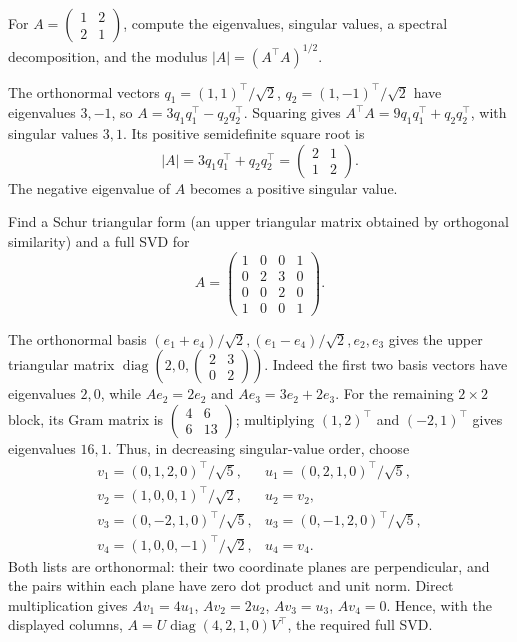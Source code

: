 \begin{problem}\label{ex:10:spectral-versus-singular}
For \(A=\begin{pmatrix}1&2\\2&1\end{pmatrix}\), compute the eigenvalues,
singular values, a spectral decomposition, and the modulus
\(|A|=(A^\top A)^{1/2}\).
\end{problem}
\begin{solution}
The orthonormal vectors \(q_1=(1,1)^\top/\sqrt2\),
\(q_2=(1,-1)^\top/\sqrt2\) have eigenvalues \(3,-1\), so
\(A=3q_1q_1^\top-q_2q_2^\top\).
Squaring gives \(A^\top A=9q_1q_1^\top+q_2q_2^\top\), with singular
values \(3,1\). Its positive semidefinite square root is
\[
|A|=3q_1q_1^\top+q_2q_2^\top=\begin{pmatrix}2&1\\1&2\end{pmatrix}.
\]
The negative eigenvalue of \(A\) becomes a positive singular value.
\end{solution}

\begin{problem}\label{ex:10:full-svd-construction}
Find a Schur triangular form (an upper triangular matrix obtained by
orthogonal similarity) and a full SVD for
\[
A=\begin{pmatrix}1&0&0&1\\0&2&3&0\\0&0&2&0\\1&0&0&1\end{pmatrix}.
\]
\end{problem}
\begin{solution}
The orthonormal basis \((e_1+e_4)/\sqrt2,(e_1-e_4)/\sqrt2,e_2,e_3\)
gives the upper triangular matrix
\(\operatorname{diag}\left(2,0,\begin{pmatrix}2&3\\0&2\end{pmatrix}\right)\).
Indeed the first two basis vectors have eigenvalues \(2,0\), while
\(Ae_2=2e_2\) and \(Ae_3=3e_2+2e_3\).
For the remaining \(2\times2\) block, its Gram matrix is
\(\begin{pmatrix}4&6\\6&13\end{pmatrix}\); multiplying \((1,2)^\top\)
and \((-2,1)^\top\) gives eigenvalues \(16,1\).
Thus, in decreasing singular-value order, choose
\[
\begin{array}{ll}
v_1=(0,1,2,0)^\top/\sqrt5,&u_1=(0,2,1,0)^\top/\sqrt5,\\
v_2=(1,0,0,1)^\top/\sqrt2,&u_2=v_2,\\
v_3=(0,-2,1,0)^\top/\sqrt5,&u_3=(0,-1,2,0)^\top/\sqrt5,\\
v_4=(1,0,0,-1)^\top/\sqrt2,&u_4=v_4.
\end{array}
\]
Both lists are orthonormal: their two coordinate planes are perpendicular,
and the pairs within each plane have zero dot product and unit norm.
Direct multiplication gives \(Av_1=4u_1\), \(Av_2=2u_2\),
\(Av_3=u_3\), \(Av_4=0\). Hence, with the displayed columns,
\(A=U\operatorname{diag}(4,2,1,0)V^\top\), the required full SVD.
\end{solution}

